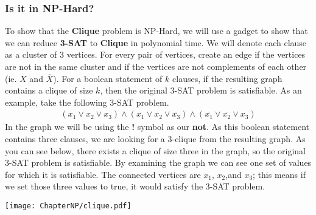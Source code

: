     \subsubsection{Is it in NP-Hard?}
        To show that the \textbf{Clique} problem is NP-Hard, we will use a gadget to show that we can reduce \textbf{3-SAT} to \textbf{Clique} in polynomial time. We will denote each clause as a cluster of 3 vertices. For every pair of vertices, create an edge if the vertices are not in the same cluster and if the vertices are not complements of each other (ie. $X$ and $\overline{X}$). For a boolean statement of $k$ clauses, if the resulting graph contains a clique of size $k$, then the original 3-SAT problem is satisfiable. As an example, take the following 3-SAT problem.
        \begin{align*}
            (x_1 \lor x_2 \lor x_3) \land (\overline{x_1} \lor x_2 \lor \overline{x_3}) \land (\overline{x_1} \lor \overline{x_2} \lor x_3)
        \end{align*}
        In the graph we will be using the \textbf{!} symbol as our \textbf{not}. As this boolean statement contains three clauses, we are looking for a 3-clique from the resulting graph. As you can see below, there exists a clique of size three in the graph, so the original 3-SAT problem is satisfiable. By examining the graph we can see one set of values for which it is satisfiable. The connected vertices are $x_1$, $x_2$,and $x_3$; this means if we set those three values to true, it would satisfy the 3-SAT problem.
        \begin{center}
            \texttt{[image: ChapterNP/clique.pdf]}
        \end{center}